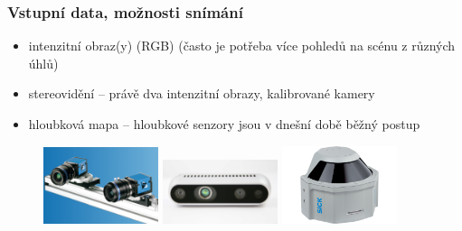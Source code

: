 \begin{frame}
\frametitle{Vstupní data, možnosti snímání}
\begin{itemize}
	\item intenzitní obraz(y) (RGB) (často je potřeba více pohledů na scénu z různých úhlů)
	\item stereovidění – právě dva intenzitní obrazy, kalibrované kamery
	\item hloubková mapa – hloubkové senzory jsou v dnešní době běžný postup 
\end{itemize}

    \begin{figure}[!ht]
	\centering
	\includegraphics[width = 0.3\textwidth]{./stereo}
	\includegraphics[width = 0.3\textwidth]{./intel}
	\includegraphics[width = 0.3\textwidth]{./lidar}
	\end{figure}
	
\end{frame}

